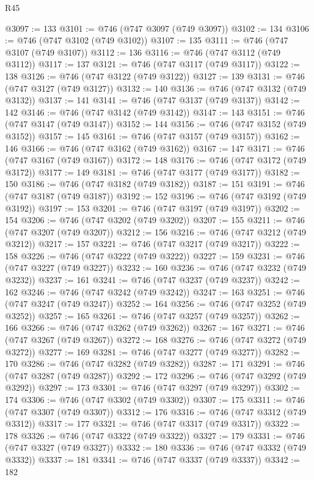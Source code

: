 \begin{lexlean}{R45}
\begin{coremodule}
@3097 := 133
@3101 := @746 (@747 @3097 (@749 @3097))
@3102 := 134
@3106 := @746 (@747 @3102 (@749 @3102))
@3107 := 135
@3111 := @746 (@747 @3107 (@749 @3107))
@3112 := 136
@3116 := @746 (@747 @3112 (@749 @3112))
@3117 := 137
@3121 := @746 (@747 @3117 (@749 @3117))
@3122 := 138
@3126 := @746 (@747 @3122 (@749 @3122))
@3127 := 139
@3131 := @746 (@747 @3127 (@749 @3127))
@3132 := 140
@3136 := @746 (@747 @3132 (@749 @3132))
@3137 := 141
@3141 := @746 (@747 @3137 (@749 @3137))
@3142 := 142
@3146 := @746 (@747 @3142 (@749 @3142))
@3147 := 143
@3151 := @746 (@747 @3147 (@749 @3147))
@3152 := 144
@3156 := @746 (@747 @3152 (@749 @3152))
@3157 := 145
@3161 := @746 (@747 @3157 (@749 @3157))
@3162 := 146
@3166 := @746 (@747 @3162 (@749 @3162))
@3167 := 147
@3171 := @746 (@747 @3167 (@749 @3167))
@3172 := 148
@3176 := @746 (@747 @3172 (@749 @3172))
@3177 := 149
@3181 := @746 (@747 @3177 (@749 @3177))
@3182 := 150
@3186 := @746 (@747 @3182 (@749 @3182))
@3187 := 151
@3191 := @746 (@747 @3187 (@749 @3187))
@3192 := 152
@3196 := @746 (@747 @3192 (@749 @3192))
@3197 := 153
@3201 := @746 (@747 @3197 (@749 @3197))
@3202 := 154
@3206 := @746 (@747 @3202 (@749 @3202))
@3207 := 155
@3211 := @746 (@747 @3207 (@749 @3207))
@3212 := 156
@3216 := @746 (@747 @3212 (@749 @3212))
@3217 := 157
@3221 := @746 (@747 @3217 (@749 @3217))
@3222 := 158
@3226 := @746 (@747 @3222 (@749 @3222))
@3227 := 159
@3231 := @746 (@747 @3227 (@749 @3227))
@3232 := 160
@3236 := @746 (@747 @3232 (@749 @3232))
@3237 := 161
@3241 := @746 (@747 @3237 (@749 @3237))
@3242 := 162
@3246 := @746 (@747 @3242 (@749 @3242))
@3247 := 163
@3251 := @746 (@747 @3247 (@749 @3247))
@3252 := 164
@3256 := @746 (@747 @3252 (@749 @3252))
@3257 := 165
@3261 := @746 (@747 @3257 (@749 @3257))
@3262 := 166
@3266 := @746 (@747 @3262 (@749 @3262))
@3267 := 167
@3271 := @746 (@747 @3267 (@749 @3267))
@3272 := 168
@3276 := @746 (@747 @3272 (@749 @3272))
@3277 := 169
@3281 := @746 (@747 @3277 (@749 @3277))
@3282 := 170
@3286 := @746 (@747 @3282 (@749 @3282))
@3287 := 171
@3291 := @746 (@747 @3287 (@749 @3287))
@3292 := 172
@3296 := @746 (@747 @3292 (@749 @3292))
@3297 := 173
@3301 := @746 (@747 @3297 (@749 @3297))
@3302 := 174
@3306 := @746 (@747 @3302 (@749 @3302))
@3307 := 175
@3311 := @746 (@747 @3307 (@749 @3307))
@3312 := 176
@3316 := @746 (@747 @3312 (@749 @3312))
@3317 := 177
@3321 := @746 (@747 @3317 (@749 @3317))
@3322 := 178
@3326 := @746 (@747 @3322 (@749 @3322))
@3327 := 179
@3331 := @746 (@747 @3327 (@749 @3327))
@3332 := 180
@3336 := @746 (@747 @3332 (@749 @3332))
@3337 := 181
@3341 := @746 (@747 @3337 (@749 @3337))
@3342 := 182

\end{coremodule}
\end{lexlean}
